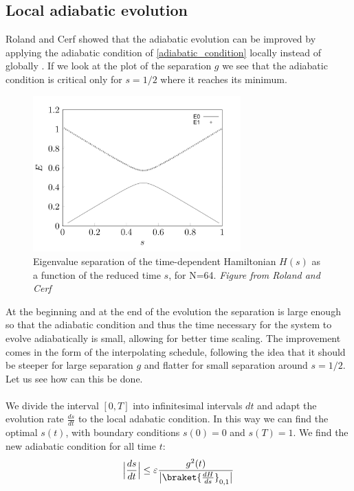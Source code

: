     \subsection{Local adiabatic evolution}\label{subsec:local adiabatic}
    Roland and Cerf showed that the adiabatic evolution can be improved by applying the adiabatic condition of \cref{adiabatic_condition} locally instead of globally \cite{Roland2002}. If we look at the plot of the separation $g$ we see that the adiabatic condition is critical only for $s=1/2$ where it reaches its minimum.
    \begin{figure}[h]
      \centering
      \includegraphics[width=80mm]{figures/chapter1/separation.pdf}
      \caption[Eigenvalue separation of the time-dependent Hamiltonian $H(s)$ as a function of the reduced time $s$, for N=64]{Eigenvalue separation of the time-dependent Hamiltonian $H(s)$ as a function of the reduced time $s$, for N=64. \textit{Figure from Roland and Cerf} \cite{Roland2002}}
      \label{separation_figure}
    \end{figure}
    At the beginning and at the end of the evolution the separation is large enough so that the adiabatic condition and thus the time necessary for the system to evolve adiabatically is small, allowing for better time scaling. The improvement comes in the form of the interpolating schedule, following the idea that it should be steeper for large separation $g$ and flatter for small separation around $s=1/2$. Let us see how can this be done. \\ \\
    We divide the interval $[0,T]$ into infinitesimal intervals $dt$ and adapt the evolution rate $\frac{ds}{dt}$ to the local adabatic condition. In this way we can find the optimal $s(t)$, with boundary conditions $s(0)=0$ and $s(T)=1$. We find the new adiabatic condition for all time $t$:
    \begin{equation}
      \Big|\frac{ds}{dt}\Big|\leq\varepsilon\frac{g^2(t)}{\big|\braket{\frac{dH}{ds}}_{0,1}\big|}
    \end{equation}

